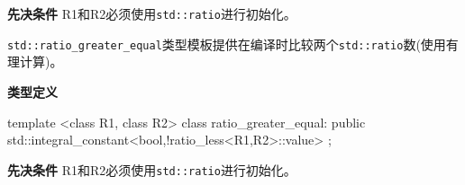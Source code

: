 \textbf{先决条件}
R1和R2必须使用\texttt{std::ratio}进行初始化。


\texttt{std::ratio\_greater\_equal}类型模板提供在编译时比较两个\texttt{std::ratio}数(使用有理计算)。

\textbf{类型定义}

\begin{cpp}
template <class R1, class R2>
class ratio_greater_equal:
  public std::integral_constant<bool,!ratio_less<R1,R2>::value>
{};
\end{cpp}

\textbf{先决条件}
R1和R2必须使用\texttt{std::ratio}进行初始化。